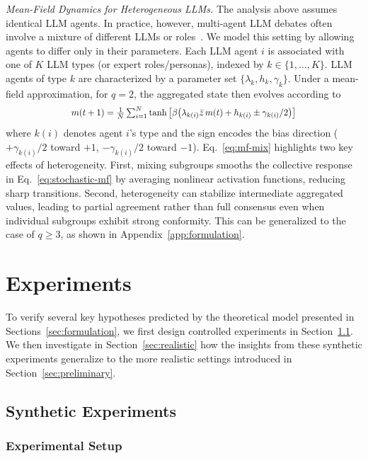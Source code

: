 \documentclass{article}
\theoremstyle{plain}
\theoremstyle{definition}
\theoremstyle{remark}
\begin{document}
\textsl{Mean-Field Dynamics for Heterogeneous LLMs.}
The analysis above assumes identical LLM agents.
In practice, however, multi-agent LLM debates often involve a mixture of different LLMs or roles~\cite{liang2023encouraging,chen2023agentverse}. 
We model this setting by allowing agents to differ only in their parameters. 
Each LLM agent $i$ is associated with one of $K$ LLM types (or expert roles/personas), indexed by $k\in\{1,\dots,K\}$.
LLM agents of type $k$ are characterized by a parameter set $\{\lambda_k, h_k, \gamma_k\}$. 
Under a mean-field approximation, for $q=2$, the aggregated state then evolves according to 
\begin{equation}\label{eq:mf-mix}
\scalebox{0.9}{$m(t+1) = \frac{1}{N} \sum_{i=1}^{N} \tanh \left[
\beta \bigl( \lambda_{k(i)} \bar{z}\, m(t)+h_{k(i)} \pm \gamma_{k(i)}/2 \bigr) \right]$}
\end{equation}
where $k(i)$ denotes agent $i$'s type and the sign encodes the bias direction ($+\gamma_{k(i)}/2$ toward $+1$, $-\gamma_{k(i)}/2$ toward $-1$). 
Eq.~\eqref{eq:mf-mix} highlights two key effects of heterogeneity. 
First, mixing subgroups smooths the collective response in Eq.~\eqref{eq:stochastic-mf} by averaging nonlinear activation functions, reducing sharp transitions.
Second, heterogeneity can stabilize intermediate aggregated values, leading to partial agreement rather than full consensus even when individual subgroups exhibit strong conformity.
This can be generalized to the case of $q \geq 3$, as shown in Appendix~\ref{app:formulation}. 


\section{Experiments}\label{sec:experiment}  
To verify several key hypotheses predicted by the theoretical model presented in Sections~\ref{sec:formulation}, we first design controlled experiments in Section~\ref{sec:synthetic}. 
We then investigate in Section~\ref{sec:realistic} how the insights from these synthetic experiments generalize to the more realistic settings introduced in Section~\ref{sec:preliminary}.


\subsection{Synthetic Experiments}\label{sec:synthetic}
\subsubsection{Experimental Setup}
\end{document}
